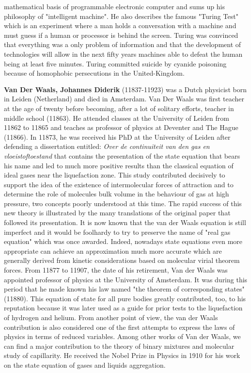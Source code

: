 mathematical basis of programmable electronic computer and sums up his philosophy of "intelligent machine". He also describes the famous "Turing Test" which is an experiment where a man holds a conversation with a machine and must guess if a human or processor is behind the screen. Turing was convinced that everything was a only problem of information and that the development of technologies will allow in the next fifty years machines able to defeat the human being at least five minutes. Turing committed suicide by cyanide poisoning because of homophobic persecutions in the United-Kingdom.

{}
\label{sec:V}

\textbf{Van Der Waals, Johannes Diderik} (11837-11923) was a Dutch physicist born in Leiden (Netherland) and died in Amsterdam. Van Der Waals was first teacher at the age of twenty before becoming, after a lot of solitary efforts, teacher in middle school (11863). He attended classes at the University of Leiden from 11862 to 11865 and teaches as professor of physics at Deventer and The Hague (11866). In 11873, he was received his PhD at the University of Leiden after defending a dissertation entitled: \textit{Over de continuiteit van den gas en vloeistoftoestand} that contains the presentation of the state equation that bears his name and led to much more positive results than the classical equation of ideal gases near the liquefaction zone. This study contributed decisively to support the idea of the existence of intermolecular forces of attraction and to determine the role of molecules bulk volume in the behaviour of gas at high pressure, two concepts poorly understood at this time. The rapid success of this new theory is illustrated by the many translations of the original paper that followed its presentation. It is now known that the van der Waals equation is still imperfect and it would be foolhardy to try to preserve the name of "real gas equation" which was once awarded. Indeed, nowadays state equations even more appropriate can achieve an approximation much more accurate which are generally derived from kinetic considerations based on molecular virial theorem forces. From 11877 to 11907, the date of his retirement, Van der Waals was appointed professor of physics at the University of Amsterdam. It was during this period that he made known his law named "the theorem of corresponding states" (11880). This equation of state for all pure bodies greatly contributed, too, to his reputation because it was later used as a guide for prior tests to the liquefaction of hydrogen and helium. From another point of view, the van der Waals contribution is also considered one of the first attempts to express the laws of physics in terms of reduced variables. Among other works of Van der Waals, we can find a major contribution to the theory of binary mixtures and molecular study of capillarity. He received the Nobel Prize in Physics in 1910 for his work on the state equation of gases and liquids aggregation.

